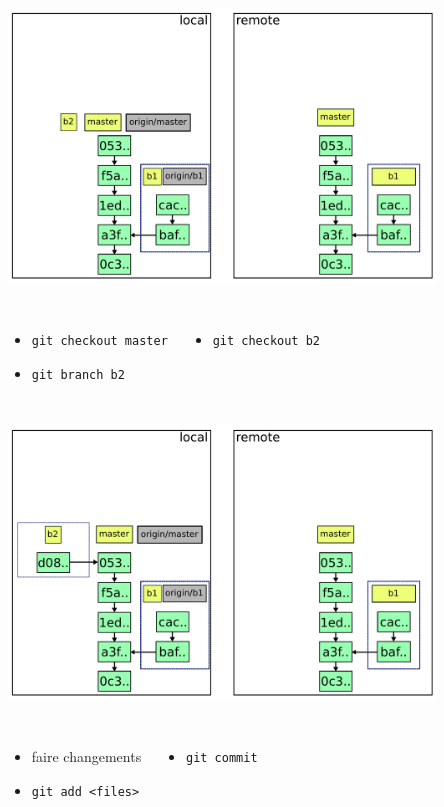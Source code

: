 \documentclass{beamer}
\begin{document}
\begin{frame}{}
  \centering
  \includegraphics[width=0.85\textwidth]{img/3.pdf}
  \begin{columns}
    \begin{itemize}
    \small
    \item \lstinline|git checkout master|
    \item \lstinline|git branch b2|
    \end{itemize}
    \begin{itemize}
    \small
    \item \lstinline|git checkout b2|
    \end{itemize}
  \end{columns}
\end{frame}

\begin{frame}{}
  \centering
  \includegraphics[width=0.85\textwidth]{img/3-bis.pdf}
  \begin{columns}
  \begin{itemize}
  \small
  \item faire changements
  \item \lstinline|git add <files>|
  \end{itemize}
  \begin{itemize}
  \small
  \item \lstinline|git commit|
  \end{itemize}
  \end{columns}
\end{frame}
\end{document}
